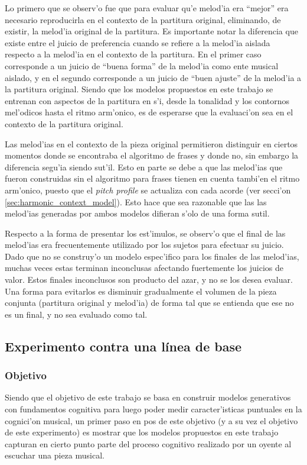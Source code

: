 Lo primero que se observ'o fue que para evaluar qu'e melod'ia era ``mejor'' era necesario reproducirla en el contexto de la partitura original, eliminando, de existir, la melod'ia original de la partitura. Es importante notar la diferencia que existe entre el juicio de preferencia cuando se refiere
a la melod'ia aislada respecto a la melod'ia en el contexto de la partitura. En el primer caso corresponde a un juicio de ``buena forma'' de la 
melod'ia como ente musical aislado, y en el segundo corresponde a un juicio de ``buen ajuste'' de la melod'ia a la partitura original. Siendo que 
los modelos propuestos en este trabajo se entrenan con aspectos de la partitura en s'i, desde la tonalidad y los contornos mel'odicos hasta el ritmo
arm'onico, es de esperarse que la evaluaci'on sea en el contexto de la partitura original.

Las melod'ias en el contexto de la pieza original permitieron distinguir en ciertos momentos donde se encontraba el algoritmo de frases y donde no,
sin embargo la diferencia segu'ia siendo sut'il. Esto en parte se debe a que las melod'ias que fueron construidas sin el algoritmo para frases
tienen en cuenta tambi'en el ritmo arm'onico, puesto que el \emph{pitch profile} se actualiza con cada acorde (ver secci'on \ref{sec:harmonic_context_model}).
Esto hace que sea razonable que las las melod'ias generadas por ambos modelos difieran s'olo de una forma sutil.

Respecto a la forma de presentar los est'imulos, se observ'o que el final de las melod'ias era frecuentemente utilizado por los sujetos para
efectuar su juicio. Dado que no se construy'o un modelo espec'ifico para los finales de las melod'ias, muchas veces estas terminan inconclusas afectando fuertemente los juicios de valor.
Estos finales inconclusos son producto del azar, y no se los desea evaluar. Una forma para evitarlos es disminuir gradualmente el volumen de la pieza conjunta
(partitura original y melod'ia) de forma tal que se entienda que ese no es un final, y no sea evaluado como tal.


\subsection{Experimento contra una l\'inea de base}
\subsubsection{Objetivo}
Siendo que el objetivo de este trabajo se basa en construir modelos generativos con fundamentos cognitiva para luego poder medir caracter'isticas puntuales
en la cognici'on musical, un primer paso en pos de este objetivo (y a su vez el objetivo de este experimento) es mostrar que los modelos propuestos 
en este trabajo capturan en cierto punto parte del proceso cognitivo realizado por un oyente al escuchar una pieza musical. 

